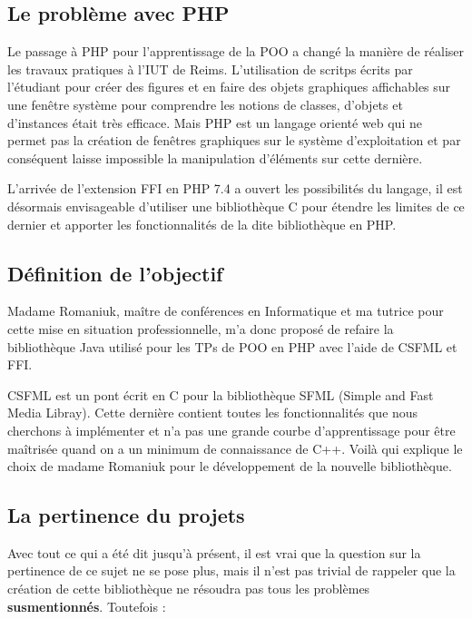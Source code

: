 \documentclass[11pt,a4paper,krantz2,11pt,oneside]{krantz}
\begin{document}
\hypertarget{le-probluxe8me-avec-php}{%
\subsection{Le problème avec PHP}\label{le-probluxe8me-avec-php}}

Le passage à PHP pour l'apprentissage de la POO a changé la manière de réaliser les travaux pratiques à l'IUT de Reims. L'utilisation de scritps écrits par l'étudiant pour créer des figures et en faire des objets graphiques affichables sur une fenêtre système pour comprendre les notions de classes, d'objets et d'instances était très efficace. Mais PHP est un langage orienté web qui ne permet pas la création de fenêtres graphiques sur le système d'exploitation et par conséquent laisse impossible la manipulation d'éléments sur cette dernière.

L'arrivée de l'extension FFI en PHP 7.4 a ouvert les possibilités du langage, il est désormais envisageable d'utiliser une bibliothèque C pour étendre les limites de ce dernier et apporter les fonctionnalités de la dite bibliothèque en PHP.

\hypertarget{duxe9finition-de-lobjectif}{%
\subsection{Définition de l'objectif}\label{duxe9finition-de-lobjectif}}

Madame Romaniuk, maître de conférences en Informatique et ma tutrice pour cette mise en situation professionnelle, m'a donc proposé de refaire la bibliothèque Java utilisé pour les TPs de POO en PHP avec l'aide de CSFML et FFI.

CSFML est un pont écrit en C pour la bibliothèque SFML (Simple and Fast Media Libray). Cette dernière contient toutes les fonctionnalités que nous cherchons à implémenter et n'a pas une grande courbe d'apprentissage pour être maîtrisée quand on a un minimum de connaissance de C++. Voilà qui explique le choix de madame Romaniuk pour le développement de la nouvelle bibliothèque.

\hypertarget{la-pertinence-du-projets}{%
\subsection{La pertinence du projets}\label{la-pertinence-du-projets}}

Avec tout ce qui a été dit jusqu'à présent, il est vrai que la question sur la pertinence de ce sujet ne se pose plus, mais il n'est pas trivial de rappeler que la création de cette bibliothèque ne résoudra pas tous les problèmes \textbf{susmentionnés}. Toutefois :
\end{document}

